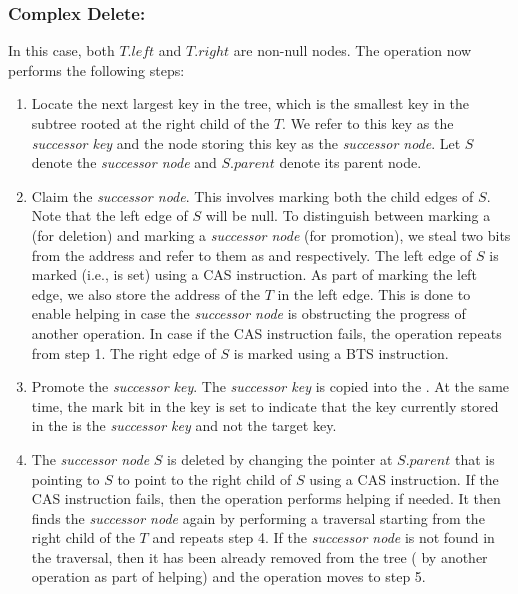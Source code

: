 \subsubsection{Complex Delete:} In this case, both $T.left$ and $T.right$ are non-null nodes. The operation now performs the following steps:
\begin{enumerate}
\item Locate the next largest key in the tree, which is the smallest key in the subtree rooted at the right child of the \terminalnode \space $T$. We refer to this key as the \textit{successor key} and the node storing this key as the \textit{successor node}. Let $S$ denote the \textit{successor node} and $S.parent$ denote its parent node.
\item Claim the \textit{successor node}. This involves marking both the child edges of $S$. Note that the left edge of $S$ will be null. To distinguish between marking a \terminalnode \space (for deletion) and marking a \textit{successor node} (for promotion), we steal two bits from the address and refer to them as \deleteFlag \space and \promoteFlag \space respectively. The left edge of $S$ is marked (i.e., \promoteFlag \space is set) using a CAS instruction. As part of marking the left edge, we also store the address of the \terminalnode \space $T$ in the left edge. This is done to enable helping in case the \textit{successor node} is obstructing the progress of another operation. In case if the CAS instruction fails, the operation repeats from step 1. The right edge of $S$ is marked using a BTS instruction.
\item Promote the \textit{successor key}. The \textit{successor key} is copied into the \terminalnode. At the same time, the mark bit in the key is set to indicate that the key currently stored in the \terminalnode \space is the \textit{successor key} and not the target key.
\item The \textit{successor node} $S$ is deleted by changing the pointer at $S.parent$ that is pointing to $S$ to point to the right child of $S$ using a CAS instruction. If the CAS instruction fails, then the operation performs helping if needed. It then finds the \textit{successor node} again by performing a traversal starting from the right child of the \terminalnode \space $T$ and repeats step 4. If the \textit{successor node} is not found in the traversal, then it has been already removed from the tree ( by another operation as part of helping) and the operation moves to step 5. 

\end{enumerate}

